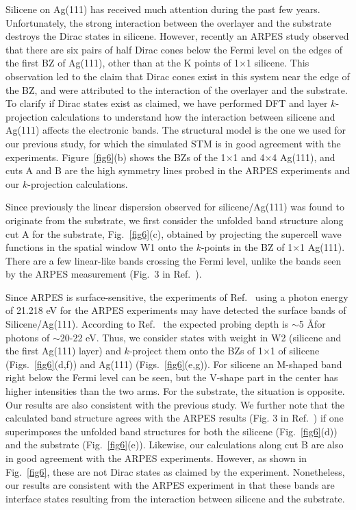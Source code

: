 \documentclass[aps,prb,showpacs,twocolumn,reprint,superscriptaddress]{revtex4-1}
\begin{document}
Silicene on Ag(111) has received much attention during the past few years.
Unfortunately, the strong interaction between the overlayer and the substrate destroys the Dirac states in silicene.
\cite{Chen2014,guo2013,wang2013Ab,cahangirov_2013,gori_2013,Mahatha_2014}
However, recently an ARPES study observed that there are six pairs of half Dirac cones below the Fermi level
on the edges of the first BZ of Ag(111), other than at the K points of 1$\times$1 silicene.\cite{Feng2016}
This observation led to the claim that Dirac cones exist in this system near the edge of the BZ,
and were attributed to the interaction of the overlayer and the substrate.
To clarify if Dirac states exist as claimed, 
we have performed DFT and
layer $k$-projection calculations to understand 
how the interaction between silicene and Ag(111) affects the electronic bands.
The structural model is the one we used for our previous study, \cite{Chen2014}
for which the simulated STM is in good agreement with the experiments.\cite{Feng2016,Vogt_PRL} 
Figure~\ref{fig6}(b) shows the BZs of the 1$\times$1 and 4$\times$4 Ag(111), and
cuts A and B are the high symmetry lines probed in the ARPES experiments and our $k$-projection calculations.

Since previously\cite{Chen2014} the linear dispersion observed for silicene/Ag(111) was found to originate from the substrate,
we first consider the unfolded band structure along cut A for the substrate, Fig.~\ref{fig6}(c), 
obtained by projecting the supercell wave functions in the spatial window W1
onto the $k$-points in the BZ of 1$\times$1 Ag(111).
There are a few linear-like bands crossing the Fermi level, 
 unlike the bands seen by the ARPES measurement (Fig.\ 3 in Ref.~).

Since ARPES is surface-sensitive, the experiments of
Ref.~ using a photon energy of 21.218 eV for the ARPES experiments may have detected  
the surface bands of Silicene/Ag(111).
According to Ref.~ the expected probing depth is $\sim$5 \AA for photons of $\sim$20-22 eV.
Thus, we consider states with weight in W2 (silicene and the first Ag(111) layer) and
$k$-project them onto the BZs of 1$\times$1 of silicene (Figs.~\ref{fig6}(d,f)) and Ag(111)
(Figs.~\ref{fig6}(e,g)).
For silicene an M-shaped band right below the Fermi level can be seen, 
but the V-shape part in the center has higher intensities than the two arms.    
For the substrate, the situation is opposite.
Our results are also consistent with the previous study.\cite{Lian2017Dirac}
We further note that the calculated band structure agrees with the ARPES results (Fig. 3 in Ref.~)
if one superimposes the unfolded band structures for both the silicene (Fig.~\ref{fig6}(d)) and the substrate
(Fig.~\ref{fig6}(e)).
Likewise, our calculations along cut B are also in good agreement with the ARPES experiments.\cite{Feng2016,Mahatha_2014}
However, as shown in Fig.~\ref{fig6}, these are not Dirac states as claimed by the experiment.  
Nonetheless, our results are consistent with the ARPES experiment 
in that these bands are interface states resulting from the interaction between silicene and the substrate. 
\end{document}
